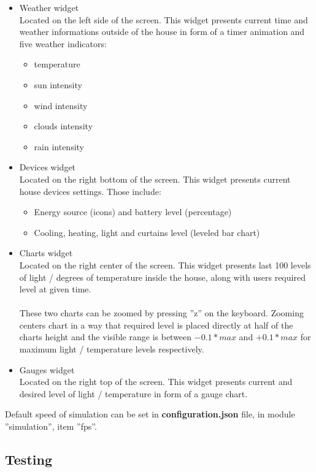 \documentclass{article}
\begin{document}
\begin{itemize}
    \item Weather widget \\
    Located on the left side of the screen. This widget presents current time and weather informations outside of the house in form of a timer animation and five weather indicators: 
    \begin{itemize}
        \item temperature
        \item sun intensity
        \item wind intensity
        \item clouds intensity
        \item rain intensity
    \end{itemize}
    \item Devices widget \\
    Located on the right bottom of the screen. This widget presents current house devices settings. Those include:
    \begin{itemize}
       \item Energy source (icons) and battery level (percentage)
       \item Cooling, heating, light and curtains level (leveled bar chart) 
    \end{itemize}
    \item Charts widget \\
    Located on the right center of the screen. This widget presents last 100 levels of light / degrees of temperature inside the house, along with users required level at given time. \\\\
    These two charts can be zoomed by pressing ''z'' on the keyboard. Zooming centers chart in a way that required level is placed directly at half of the charts height and the visible range is between $-0.1 * max$ and $+0.1 * max$ for maximum light / temperature levels respectively.
    \item Gauges widget \\
    Located on the right top of the screen. This widget presents current and desired level of light / temperature in form of a gauge chart.
\end{itemize}

Default speed of simulation can be set in \textbf{configuration.json} file, in module ''simulation'', item ''fps''.

\subsection{Testing}
\end{document}
